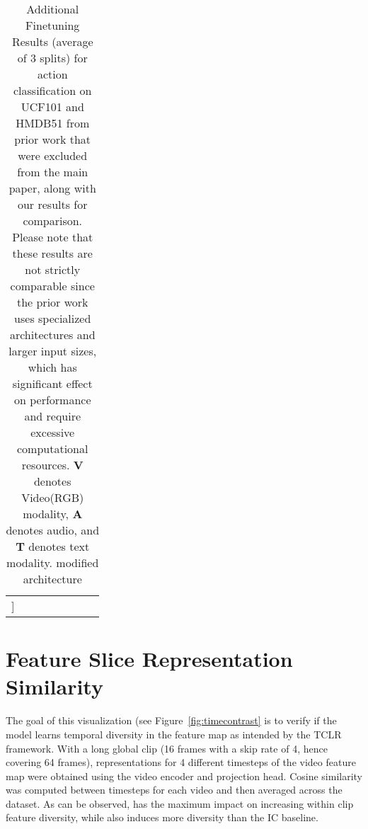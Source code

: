 \documentclass[10pt,twocolumn,letterpaper]{article}
\begin{document}
\begin{table*}[h!]
\begin{tabular}{lclccccc}
\hline

\hline\-3mm]
\end{tabular}

\caption{Additional Finetuning Results (average of 3 splits) for action classification on UCF101 and HMDB51 from prior work that were excluded from the main paper, along with our results for comparison. Please note that these results are not strictly comparable since the prior work uses specialized architectures and larger input sizes, which has significant effect on performance and require excessive computational resources. \textbf{V} denotes Video(RGB) modality, \textbf{A} denotes audio, and \textbf{T} denotes text modality.  modified architecture}
\label{table:results}
\end{table*}













\section{Feature Slice Representation Similarity}
\label{sec:feature_slice_similarity}

The goal of this visualization (see Figure~\ref{fig:timecontrast} is to verify if the model learns temporal diversity in the feature map as intended by the TCLR framework. With a long global clip (16 frames with a skip rate of 4, hence covering 64 frames), representations for 4 different timesteps of the video feature map were obtained using the video encoder and projection head. Cosine similarity was computed between timesteps for each video and then averaged across the dataset. As can be observed,  has the maximum impact on increasing within clip feature diversity, while  also induces more diversity than the IC baseline. 
\end{document}
